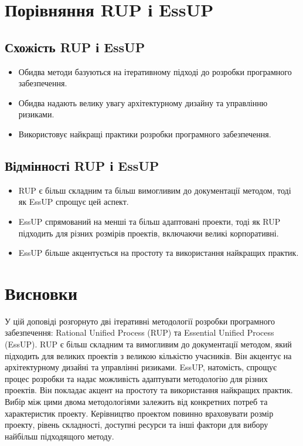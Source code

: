 \documentclass[letterpaper]{report}
\begin{document}
	\section{Порівняння RUP і EssUP}

		\subsection{Схожість RUP і EssUP}
			\begin{itemize}
				\item Обидва методи базуються на ітеративному підході до розробки програмного забезпечення.
				\item Обидва надають велику увагу архітектурному дизайну та управлінню ризиками.
				\item Використовує найкращі практики розробки програмного забезпечення.
			\end{itemize}

		\subsection{Відмінності RUP і EssUP}
			\begin{itemize}
				\item RUP є більш складним та більш вимогливим до документації методом, тоді як EssUP спрощує цей аспект.
				\item EssUP спрямований на менші та більш адаптовані проекти, тоді як RUP підходить для різних розмірів проектів, включаючи великі корпоративні.
				\item EssUP більше акцентується на простоту та використання найкращих практик.
			\end{itemize}

	\section{Висновки}

		У цій доповіді розгорнуто дві ітеративні методології розробки програмного забезпечення: Rational Unified Process (RUP) та Essential Unified Process (EssUP).
		RUP є більш складним та вимогливим до документації методом, який підходить для великих проектів з великою кількістю учасників. Він акцентує на архітектурному дизайні та управлінні ризиками.
		EssUP, натомість, спрощує процес розробки та надає можливість адаптувати методологію для різних проектів. Він покладає акцент на простоту та використання найкращих практик.
		Вибір між цими двома методологіями залежить від конкретних потреб та характеристик проекту. Керівництво проектом повинно враховувати розмір проекту, рівень складності, доступні ресурси та інші фактори для вибору найбільш підходящого методу.
\end{document}
